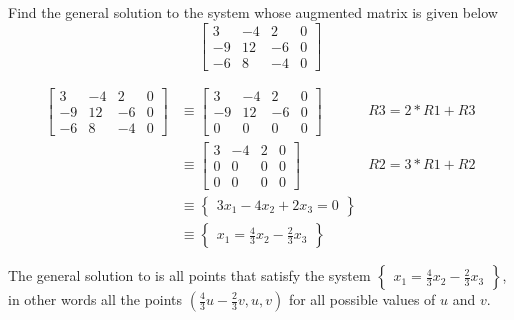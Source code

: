 \documentclass{../mathhomework}
\begin{document}
\begin{problem}[1.2\#11]
    Find the general solution to the system whose augmented matrix is given below
    $$\begin{bmatrix}
        3 & -4 & 2 & 0 \\
        -9 & 12 & -6 & 0 \\
        -6 & 8 & -4 & 0
    \end{bmatrix}$$

    \begin{solution}
        \begin{align*}
            \begin{bmatrix}
                3 & -4 & 2 & 0 \\
                -9 & 12 & -6 & 0 \\
                -6 & 8 & -4 & 0
            \end{bmatrix}
            & \equiv
            \begin{bmatrix}
                3 & -4 & 2 & 0 \\
                -9 & 12 & -6 & 0 \\
                0 & 0 & 0 & 0
            \end{bmatrix}
            & R3 = 2 * R1 + R3 \\ & \equiv
            \begin{bmatrix}
                3 & -4 & 2 & 0 \\
                0 & 0 & 0 & 0 \\
                0 & 0 & 0 & 0
            \end{bmatrix}
            & R2 = 3 * R1 + R2 \\ & \equiv
            \begin{Bmatrix}
                3x_1 -4x_2 + 2x_3 = 0
            \end{Bmatrix}
            \\ & \equiv
            \begin{Bmatrix}
                x_1 = \frac{4}{3}x_2 - \frac{2}{3}x_3
            \end{Bmatrix}
        \end{align*}

        The general solution to is all points that satisfy the system $\begin{Bmatrix}
            x_1 = \frac{4}{3}x_2 - \frac{2}{3}x_3
        \end{Bmatrix}$, in other words all the points $(\frac{4}{3}u - \frac{2}{3}v, u, v)$ for all possible values of $u$ and $v$.
    \end{solution}
\end{problem}
\end{document}
